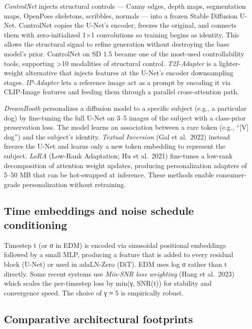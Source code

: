 \documentclass{article}
\begin{document}
\emph{ControlNet} \citep{zhang2023addingconditionalc} injects structural controls --- Canny edges, depth maps, segmentation maps, OpenPose skeletons, scribbles, normals --- into a frozen Stable Diffusion U-Net. ControlNet copies the U-Net's encoder, freezes the original, and connects them with zero-initialized 1×1 convolutions so training begins as identity. This allows the structural signal to refine generation without destroying the base model's prior. ControlNet on SD 1.5 became one of the most-used controllability tools, supporting \textgreater10 modalities of structural control. \emph{T2I-Adapter} \citep{mou20242024} is a lighter-weight alternative that injects features at the U-Net's encoder downsampling stages. \emph{IP-Adapter} lets a reference image act as a prompt by encoding it via CLIP-Image features and feeding them through a parallel cross-attention path.

\emph{DreamBooth} \citep{ruiz2023dreamboothfinetuni} personalizes a diffusion model to a specific subject (e.g., a particular dog) by fine-tuning the full U-Net on 3--5 images of the subject with a class-prior preservation loss. The model learns an association between a rare token (e.g., ``{[}V{]} dog'') and the subject's identity. \emph{Textual Inversion} (Gal et al.~2022) instead freezes the U-Net and learns only a new token embedding to represent the subject. \emph{LoRA} (Low-Rank Adaptation; Hu et al.~2021) fine-tunes a low-rank decomposition of attention weight updates, producing personalization adapters of 5--50 MB that can be hot-swapped at inference. These methods enable consumer-grade personalization without retraining.

\subsection{Time embeddings and noise schedule conditioning}\label{time-embeddings-and-noise-schedule-conditioning}

Timestep t (or σ in EDM) is encoded via sinusoidal positional embeddings followed by a small MLP, producing a feature that is added to every residual block (U-Net) or used in adaLN-Zero (DiT). EDM uses log σ rather than t directly. Some recent systems use \emph{Min-SNR loss weighting} (Hang et al.~2023) which scales the per-timestep loss by min(γ, SNR(t)) for stability and convergence speed. The choice of γ ≈ 5 is empirically robust.

\subsection{Comparative architectural footprints}\label{comparative-architectural-footprints}
\end{document}
